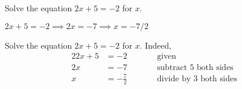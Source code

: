 \documentclass{article}
\author{D.P. Story}
\begin{document}
\maketitle


\begin{problem}
Solve the equation $ 2x + 5 = -2 $ for $x$. 
\begin{solution}[]
\begin{ssol}
$ 2x + 5 = -2 \implies 2x = -7 \implies x = -7/2 $
\end{ssol}
\begin{lsol}
Solve the equation $ 2x + 5 = -2 $ for $x$. Indeed,
\begin{alignat*}{2}
    2x + 5 &= -2 &&\qquad\text{given}\\
        2x &= -7 &&\qquad\text{subtract $5$ both sides}\\
         x &= \boxed{-\frac{7}{2}}
            &&\qquad\text{divide by $3$ both sides}\\
\end{alignat*}
\end{lsol}
\end{solution}
\end{problem}
\end{document}
